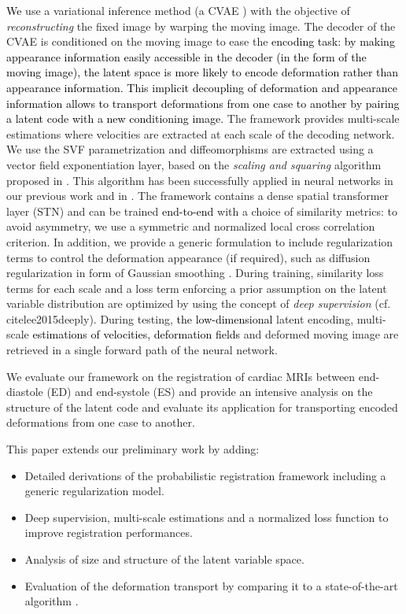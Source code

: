 \documentclass[journal]{IEEEtran}
\newcommand{\update}[1]{\textcolor{black}{#1}}
\begin{document}
\update{We} use a variational inference method (a CVAE \cite{kingma2014semi}) with the objective of \emph{reconstructing} the fixed image by warping the moving image. The decoder of the CVAE is conditioned on the moving image to ease the \update{encoding task: by making appearance information easily accessible in the decoder (in the form of the moving image), the latent space is more likely to encode deformation rather than appearance information. This implicit decoupling of deformation and appearance information allows to transport deformations from one case to another by pairing a latent code with a new conditioning image.} The framework provides multi-scale estimations where velocities are extracted at each scale of the decoding network. We use the SVF parametrization and diffeomorphisms are extracted using a vector field exponentiation layer, based on the \emph{scaling and squaring} algorithm proposed in \cite{arsigny2006log}. This algorithm has been successfully applied in neural networks in our previous work \cite{krebs2018unsupervised} and in \cite{dalca2018unsupervised}. The framework contains a dense spatial transformer layer (STN) and can be trained \update{end-to-end} with a choice of similarity metrics: to avoid asymmetry, we use a symmetric and normalized local cross correlation criterion. In addition, we provide a generic formulation to include regularization terms to control the deformation appearance (if required), such as diffusion regularization in form of Gaussian smoothing \cite{lorenzi2013lcc}. During training, similarity loss terms for each scale and a loss term enforcing a prior assumption on the latent variable distribution are optimized by using the concept of \emph{deep supervision} (cf.\\cite{lee2015deeply}). During testing, \update{the low-dimensional} latent encoding, multi-scale \update{estimations of velocities, deformation fields} and deformed moving image are retrieved in a single forward path of the neural network. 

We evaluate our framework on the registration of cardiac MRIs between end-diastole (ED) and end-systole (ES) and provide an intensive analysis on the structure of the latent code and evaluate its application for transporting encoded deformations from one case to another. 

This paper extends our preliminary work \cite{krebs2018unsupervised} by adding:
\begin{itemize}[noitemsep]
\item Detailed derivations of the probabilistic registration framework including a generic regularization model.
\item Deep supervision, multi-scale estimations and a normalized loss function to improve registration performances.
\item Analysis of size and structure of the latent variable space.
\item Evaluation of the deformation transport by comparing it to a state-of-the-art algorithm \cite{lorenzi2014efficient}.
\end{itemize}
\end{document}
